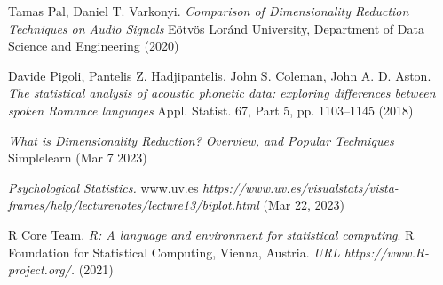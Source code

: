 \begin{thebibliography}{99}
    Tamas Pal, Daniel T. Varkonyi. \textit{Comparison of Dimensionality Reduction Techniques on Audio Signals} Eötvös Loránd University, Department of Data Science and Engineering (2020)

    Davide Pigoli, Pantelis Z. Hadjipantelis, John S. Coleman, John A. D. Aston. \textit{The statistical analysis of acoustic phonetic data: exploring differences between spoken Romance languages} Appl. Statist. 67, Part 5, pp. 1103–1145 (2018)

    \textit{What is Dimensionality Reduction? Overview, and Popular Techniques} Simplelearn (Mar 7 2023)

    \textit{Psychological Statistics.} www.uv.es \textit{ https://www.uv.es/visualstats/vista-frames/help/lecturenotes/lecture13/biplot.html} (Mar 22, 2023)

    R Core Team. \textit{R: A language and environment for statistical computing}. R Foundation for Statistical Computing, Vienna, Austria. \textit{URL https://www.R-project.org/.} (2021)
    
\end{thebibliography}